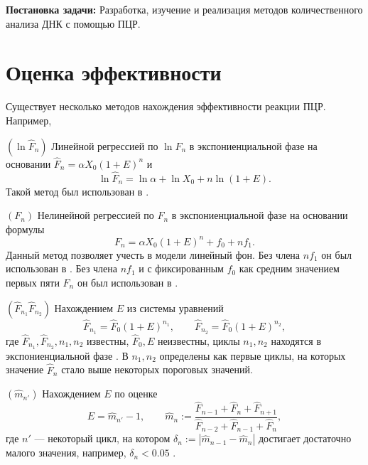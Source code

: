   {\bf Постановка задачи:} Разработка, изучение и реализация методов
количественного анализа ДНК с помощью ПЦР.

\section{Оценка эффективности}\label{sec:eff}

Существует несколько методов нахождения эффективности реакции ПЦР. Например,
\begin{labeldesc}
  \item[$(\ln\hat F_{n})$]\label{item:method_log}
  Линейной регрессией по $\ln\hat F_{n}$ в экспониенциальной фазе на
  основании $\hat F_{n}=\alpha X_0(1+E)^{n}$ и
  \[
    \ln \hat F_{n}=\ln\alpha + \ln X_0+n\ln(1+E).
  \]
  Такой метод был использован в
  \cite{wiesnerCountingTargetMolecules1992,ramakersAssumptionfreeAnalysisQuantitative2003}.

  \item[$(F_{n})$]\label{item:method_lin}
  Нелинейной регрессией по $F_{n}$ в экспониенциальной фазе на основании
  формулы
  \[
    F_{n}=\alpha X_0(1+E)^{n}+f_0+nf_1.
  \]
  Данный метод позволяет учесть в модели линейный фон. Без члена $nf_1$ он был
  использован в \cite{tichopadStandardizedDeterminationRealtime2003}. Без
  члена $nf_1$ и с фиксированным $f_0$ как средним значением первых пяти
  $F_{n}$ он был использован в \cite{barKineticOutlierDetection2003}.

  \item[$(\hat F_{n_1}\hat F_{n_2})$]\label{item:method_sys}
  Нахождением $E$ из системы уравнений
  \[
    \hat F_{n_1}=\hat F_0(1+E)^{n_1},\qquad \hat F_{n_2}=\hat F_0(1+E)^{n_2},
  \]
  где $\hat F_{n_1},\hat F_{n_2},n_1,n_2$ известны, $\hat F_0,E$ неизвестны,
  циклы $n_1,n_2$ находятся в экспониенциальной фазе
  \cite{liuNewQuantitativeMethod2002}. В \cite{liuNewQuantitativeMethod2002}
  $n_1,n_2$ определены как первые циклы, на которых значение $\hat F_{n}$ стало
  выше некоторых пороговых значений.

  \item[$(\hat m_{n'})$]\label{item:method_estimate}
  Нахождением $E$ по оценке
  \[
    E=\hat m_{n'}-1,\qquad
    \hat m_{n}:=\frac{\hat F_{n-1}+\hat F_{n}+\hat F_{n+1}}
    {\hat F_{n-2}+\hat F_{n-1}+\hat F_{n}},
  \]
  где $n'$ --- некоторый цикл, на котором
  $\delta_{n}:=|\hat m_{n-1}-\hat m_{n}|$ достигает достаточно малого значения,
  например, $\delta_{n}<0.05$ \cite{peccoudStatisticalEstimationsPCR1998}.


\end{labeldesc}
